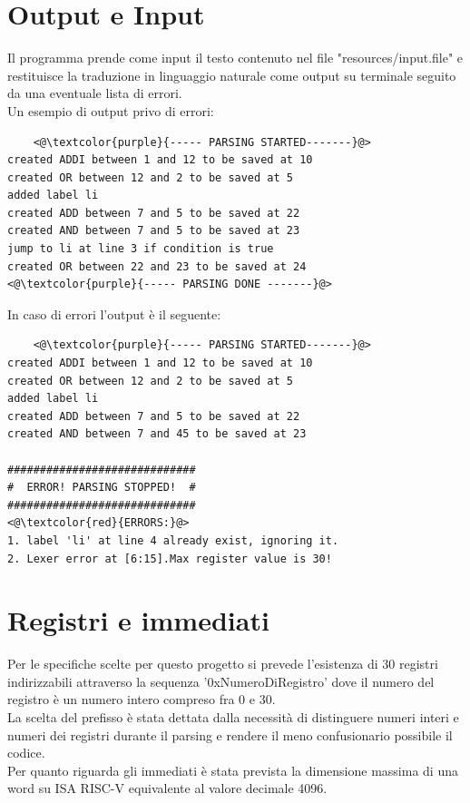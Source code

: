 \section{Output e Input}
Il programma prende come input il testo contenuto nel file "resources/input.file" e restituisce la traduzione in linguaggio naturale come output su terminale seguito da una eventuale lista di errori.
\\Un esempio di output privo di errori:
\begin{lstlisting}
    <@\textcolor{purple}{----- PARSING STARTED-------}@>
created ADDI between 1 and 12 to be saved at 10
created OR between 12 and 2 to be saved at 5
added label li
created ADD between 7 and 5 to be saved at 22
created AND between 7 and 5 to be saved at 23
jump to li at line 3 if condition is true
created OR between 22 and 23 to be saved at 24
<@\textcolor{purple}{----- PARSING DONE -------}@>
\end{lstlisting}
In caso di errori l'output è il seguente:
\begin{lstlisting}
    <@\textcolor{purple}{----- PARSING STARTED-------}@>
created ADDI between 1 and 12 to be saved at 10
created OR between 12 and 2 to be saved at 5
added label li
created ADD between 7 and 5 to be saved at 22
created AND between 7 and 45 to be saved at 23

#############################
#  ERROR! PARSING STOPPED!  #
#############################
<@\textcolor{red}{ERRORS:}@>
1. label 'li' at line 4 already exist, ignoring it.
2. Lexer error at [6:15].Max register value is 30!
\end{lstlisting}






\section{Registri e immediati}
Per le specifiche scelte per questo progetto si prevede l'esistenza di 30 registri indirizzabili attraverso la sequenza '0xNumeroDiRegistro' dove il numero del registro è un numero intero compreso fra 0 e 30.
\\La scelta del prefisso è stata dettata dalla necessità di distinguere numeri interi e numeri dei registri durante il parsing e rendere il meno confusionario possibile il codice.
\\Per quanto riguarda gli immediati è stata prevista la dimensione massima di una word su ISA RISC-V equivalente al valore decimale 4096.
